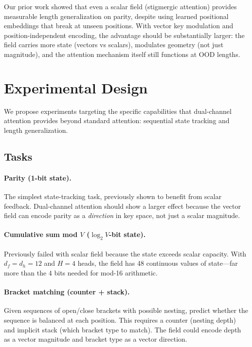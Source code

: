 \documentclass[11pt,a4paper]{article}
\begin{document}
Our prior work showed that even a scalar field (stigmergic
attention) provides measurable length generalization on parity,
despite using learned positional embeddings that break at unseen
positions.  With vector key modulation and position-independent
encoding, the advantage should be substantially larger: the field
carries more state (vectors vs scalars), modulates geometry (not
just magnitude), and the attention mechanism itself still functions
at OOD lengths.


\section{Experimental Design}
\label{sec:experiments}

We propose experiments targeting the specific capabilities that
dual-channel attention provides beyond standard attention:
sequential state tracking and length generalization.

\subsection{Tasks}

\paragraph{Parity (1-bit state).}
The simplest state-tracking task, previously shown to benefit from
scalar feedback.  Dual-channel attention should show a larger effect
because the vector field can encode parity as a \emph{direction} in
key space, not just a scalar magnitude.

\paragraph{Cumulative sum mod $V$ ($\log_2 V$-bit state).}
Previously failed with scalar field because the state exceeds scalar
capacity.  With $d_f = d_h = 12$ and $H = 4$ heads, the field has
48 continuous values of state---far more than the 4 bits needed for
mod-16 arithmetic.

\paragraph{Bracket matching (counter + stack).}
Given sequences of open/close brackets with possible nesting, predict
whether the sequence is balanced at each position.  This requires a
counter (nesting depth) and implicit stack (which bracket type to
match).  The field could encode depth as a vector magnitude and
bracket type as a vector direction.
\end{document}
